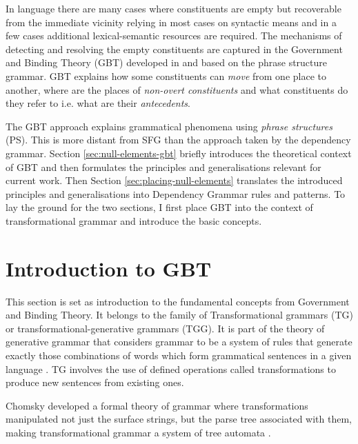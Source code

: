 In language there are many cases where constituents are empty but recoverable from the immediate vicinity relying in most cases on syntactic means and in a few cases additional lexical-semantic resources are required. The mechanisms of detecting and resolving the empty constituents are captured in the Government and Binding Theory (GBT) developed in \citep{Chomsky81, Chomsky1982, Chomsky1986} and based on the phrase structure grammar. GBT explains how some constituents can \textit{move} from one place to another, where are the places of \textit{non-overt constituents} and what constituents do they refer to i.e. what are their \textit{antecedents}. 

The GBT approach explains grammatical phenomena using \textit{phrase structures} (PS). This is more distant from SFG than the approach taken by the dependency grammar. Section \ref{sec:null-elements-gbt} briefly introduces the theoretical context of GBT and then formulates the principles and generalisations relevant for current work. Then Section \ref{sec:placing-null-elements} translates the introduced principles and generalisations into Dependency Grammar rules and patterns. To lay the ground for the two sections, I first place GBT into the context of transformational grammar and introduce the basic concepts.

\section{Introduction to GBT}
\label{sec:phrase-structure}

This section is set as introduction to the fundamental concepts from Government and Binding Theory. It belongs to the family of Transformational grammars (TG) or transformational-generative grammars (TGG). It is part of the theory of generative grammar that considers grammar to be a system of rules that generate exactly those combinations of words which form grammatical sentences in a given language \mbox{\citep{Chomsky65}}. TG involves the use of defined operations called transformations to produce new sentences from existing ones.

Chomsky developed a formal theory of grammar \citep{Chomsky56} where transformations manipulated not just the surface strings, but the parse tree associated with them, making transformational grammar a system of tree automata \mbox{\citep{Stockwell1973}}.

